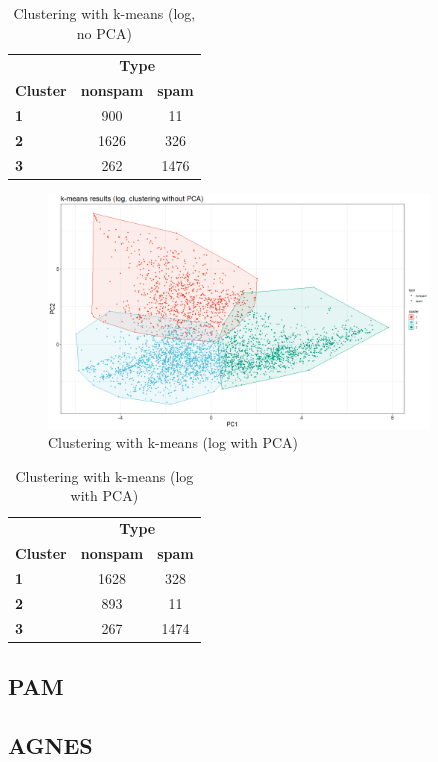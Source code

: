 \documentclass{article}
\begin{document}
	\begin{table}[h]
		\centering
		\begin{tabular}{lcc}
			& \multicolumn{2}{c}{\textbf{Type}} \\
			\textbf{Cluster} & \textbf{nonspam} & \textbf{spam} \\
			\textbf{1} & 900 & 11 \\
			\textbf{2} & 1626 & 326 \\
			\textbf{3} & 262 & 1476 \\
		\end{tabular}
		\caption{Clustering with k-means (log, no PCA)}
		\label{tab::clust_kmeans_log}
	\end{table}

	\begin{figure}[h]
		\centering
		\includegraphics[width=0.9\textwidth]{proj2_plots/kmeans_res_log.png}
		\caption{Clustering with k-means (log with PCA)}
		\label{fig::clust_kmeans_log_pca}
	\end{figure}

	\begin{table}[h]
		\centering
		\begin{tabular}{lcc}
			& \multicolumn{2}{c}{\textbf{Type}} \\
			\textbf{Cluster} & \textbf{nonspam} & \textbf{spam} \\
			\textbf{1} & 1628 & 328 \\
			\textbf{2} & 893 & 11 \\
			\textbf{3} & 267 & 1474 \\
		\end{tabular}
		\caption{Clustering with k-means (log with PCA)}
		\label{tab::clust_kmeans_log_pca}
	\end{table}
	
	\subsection{PAM}
	
	\subsection{AGNES}
	 
\end{document}
